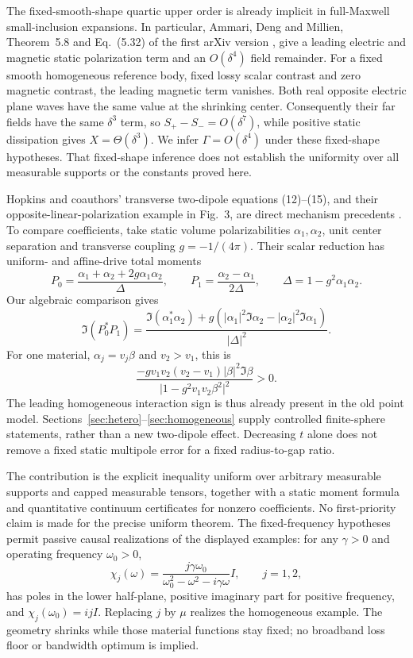 \documentclass[11pt]{article}
\newcommand{\abs}[1]{\lvert #1\rvert}
\begin{document}
The fixed-smooth-shape quartic upper order is already implicit in full-Maxwell small-inclusion expansions. In particular, Ammari, Deng and Millien, Theorem~5.8 and Eq.~(5.32) of the first arXiv version \citep{AmmariDengMillien2014}, give a leading electric and magnetic static polarization term and an $O(\delta^4)$ field remainder. For a fixed smooth homogeneous reference body, fixed lossy scalar contrast and zero magnetic contrast, the leading magnetic term vanishes. Both real opposite electric plane waves have the same value at the shrinking center. Consequently their far fields have the same $\delta^3$ term, so $S_+-S_-=O(\delta^7)$, while positive static dissipation gives $X=\Theta(\delta^3)$. We infer $\Gamma=O(\delta^4)$ under these fixed-shape hypotheses. That fixed-shape inference does not establish the uniformity over all measurable supports or the constants proved here.

Hopkins and coauthors' transverse two-dipole equations (12)--(15), and their opposite-linear-polarization example in Fig.~3, are direct mechanism precedents \citep{Hopkins2015}. To compare coefficients, take static volume polarizabilities $\alpha_1,\alpha_2$, unit center separation and transverse coupling $g=-1/(4\pi)$. Their scalar reduction has uniform- and affine-drive total moments
\[
 P_0=\frac{\alpha_1+\alpha_2+2g\alpha_1\alpha_2}{\Delta},\qquad
 P_1=\frac{\alpha_2-\alpha_1}{2\Delta},\qquad
 \Delta=1-g^2\alpha_1\alpha_2.
\]
Our algebraic comparison gives
\[
 \Im(P_0^*P_1)=
 \frac{\Im(\alpha_1^*\alpha_2)
 +g(\abs{\alpha_1}^2\Im\alpha_2-\abs{\alpha_2}^2\Im\alpha_1)}{\abs\Delta^2}.
\]
For one material, $\alpha_j=v_j\beta$ and $v_2>v_1$, this is
\[
 \frac{-gv_1v_2(v_2-v_1)\abs\beta^2\Im\beta}
 {\abs{1-g^2v_1v_2\beta^2}^2}>0.
\]
The leading homogeneous interaction sign is thus already present in the old point model. Sections~\ref{sec:hetero}--\ref{sec:homogeneous} supply controlled finite-sphere statements, rather than a new two-dipole effect. Decreasing $t$ alone does not remove a fixed static multipole error for a fixed radius-to-gap ratio.

The contribution is the explicit inequality uniform over arbitrary measurable supports and capped measurable tensors, together with a static moment formula and quantitative continuum certificates for nonzero coefficients. No first-priority claim is made for the precise uniform theorem. The fixed-frequency hypotheses permit passive causal realizations of the displayed examples: for any $\gamma>0$ and operating frequency $\omega_0>0$,
\begin{equation}\label{eq:lorentz}
 \chi_j(\omega)=\frac{j\gamma\omega_0}{\omega_0^2-\omega^2-i\gamma\omega}I,
 \qquad j=1,2,
\end{equation}
has poles in the lower half-plane, positive imaginary part for positive frequency, and $\chi_j(\omega_0)=ijI$. Replacing $j$ by $\mu$ realizes the homogeneous example. The geometry shrinks while those material functions stay fixed; no broadband loss floor or bandwidth optimum is implied.
\end{document}
